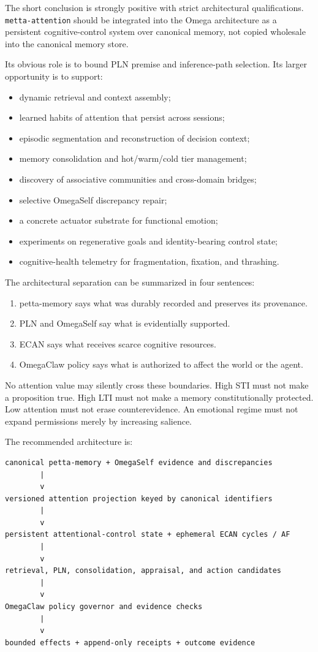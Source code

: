 \documentclass[11pt]{article}
\newcommand{\code}[1]{\texttt{#1}}
\begin{document}
The short conclusion is strongly positive with strict architectural
qualifications.  \code{metta-attention} should be integrated into the
Omega architecture as a persistent cognitive-control system over canonical
memory, not copied wholesale into the canonical memory store.

Its obvious role is to bound PLN premise and inference-path selection.  Its
larger opportunity is to support:
\begin{itemize}
  \item dynamic retrieval and context assembly;
  \item learned habits of attention that persist across sessions;
  \item episodic segmentation and reconstruction of decision context;
  \item memory consolidation and hot/warm/cold tier management;
  \item discovery of associative communities and cross-domain bridges;
  \item selective OmegaSelf discrepancy repair;
  \item a concrete actuator substrate for functional emotion;
  \item experiments on regenerative goals and identity-bearing control state;
  \item cognitive-health telemetry for fragmentation, fixation, and thrashing.
\end{itemize}

The architectural separation can be summarized in four sentences:
\begin{enumerate}
  \item petta-memory says what was durably recorded and preserves its provenance.
  \item PLN and OmegaSelf say what is evidentially supported.
  \item ECAN says what receives scarce cognitive resources.
  \item OmegaClaw policy says what is authorized to affect the world or the agent.
\end{enumerate}
No attention value may silently cross these boundaries.  High STI must not make
a proposition true.  High LTI must not make a memory constitutionally protected.
Low attention must not erase counterevidence.  An emotional regime must not
expand permissions merely by increasing salience.

The recommended architecture is:
\begin{verbatim}
canonical petta-memory + OmegaSelf evidence and discrepancies
        |
        v
versioned attention projection keyed by canonical identifiers
        |
        v
persistent attentional-control state + ephemeral ECAN cycles / AF
        |
        v
retrieval, PLN, consolidation, appraisal, and action candidates
        |
        v
OmegaClaw policy governor and evidence checks
        |
        v
bounded effects + append-only receipts + outcome evidence
\end{verbatim}
\end{document}
